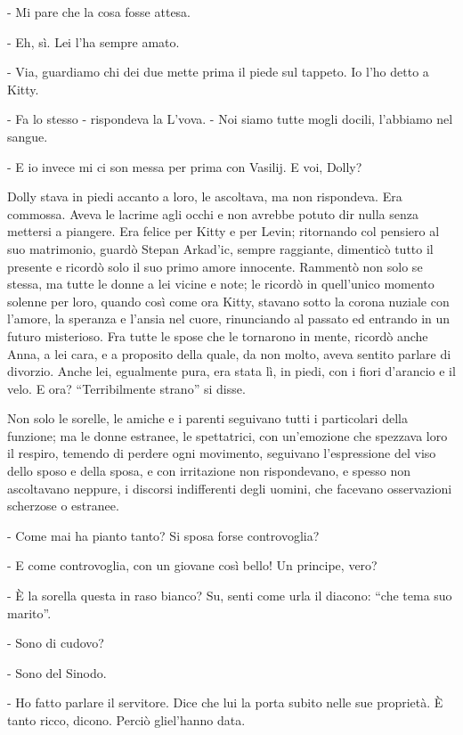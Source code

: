 - Mi pare che la cosa fosse attesa. 

- Eh, sì. Lei l'ha sempre amato. 

- Via, guardiamo chi dei due mette prima il piede sul tappeto. Io l'ho detto a Kitty. 

- Fa lo stesso - rispondeva la L'vova. - Noi siamo tutte mogli docili, l'abbiamo nel sangue. 

- E io invece mi ci son messa per prima con Vasilij. E voi, Dolly? 

Dolly stava in piedi accanto a loro, le ascoltava, ma non rispondeva. Era commossa. Aveva le lacrime agli occhi e non avrebbe potuto dir nulla senza mettersi a piangere. Era felice per Kitty e per Levin; ritornando col pensiero al suo matrimonio, guardò Stepan Arkad'ic, sempre raggiante, dimenticò tutto il presente e ricordò solo il suo primo amore innocente. Rammentò non solo se stessa, ma tutte le donne a lei vicine e note; le ricordò in quell'unico momento solenne per loro, quando così come ora Kitty, stavano sotto la corona nuziale con l'amore, la speranza e l'ansia nel cuore, rinunciando al passato ed entrando in un futuro misterioso. Fra tutte le spose che le tornarono in mente, ricordò anche Anna, a lei cara, e a proposito della quale, da non molto, aveva sentito parlare di divorzio. Anche lei, egualmente pura, era stata lì, in piedi, con i fiori d'arancio e il velo. E ora? ``Terribilmente strano'' si disse. 

Non solo le sorelle, le amiche e i parenti seguivano tutti i particolari della funzione; ma le donne estranee, le spettatrici, con un'emozione che spezzava loro il respiro, temendo di perdere ogni movimento, seguivano l'espressione del viso dello sposo e della sposa, e con irritazione non rispondevano, e spesso non ascoltavano neppure, i discorsi indifferenti degli uomini, che facevano osservazioni scherzose o estranee. 

- Come mai ha pianto tanto? Si sposa forse controvoglia? 

- E come controvoglia, con un giovane così bello! Un principe, vero? 

- È la sorella questa in raso bianco? Su, senti come urla il diacono: ``che tema suo marito''. 

- Sono di cudovo? 

- Sono del Sinodo. 

- Ho fatto parlare il servitore. Dice che lui la porta subito nelle sue proprietà. È tanto ricco, dicono. Perciò gliel'hanno data. 

